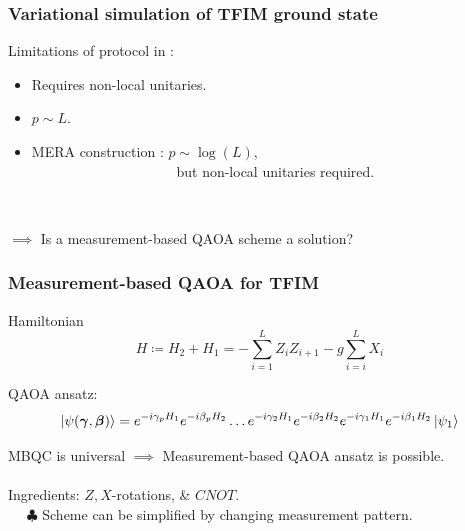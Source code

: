 \documentclass{beamer}
\theoremstyle{definition}
\begin{document}

\begin{frame}
\frametitle{Variational simulation of TFIM ground state}


Limitations of protocol in \cite{VQCS}: 
\begin{itemize}
	
	\item Requires non-local unitaries. 
	
	\item  $p \sim L$.
	
	\item MERA construction \cite{MERA}: $p\sim \log(L)$, \\
	$\quad\quad\quad\quad\quad\quad\qquad\qquad$ but non-local unitaries required.
\end{itemize}

$\,$\\

\pause

$\implies$ Is a measurement-based QAOA scheme a solution?






\end{frame}








\begin{frame}
\frametitle{Measurement-based QAOA for TFIM}

Hamiltonian
\begin{equation*}
H \coloneqq H_2 + H_1 =  - \sum_{i=1}^L Z_i Z_{i+1} - g\sum^L_{i=i}X_i
\end{equation*}


QAOA ansatz:
\begin{equation*}
\left\vert{\psi(\bm{\gamma}, \bm{\beta})}\right\rangle =  \strut {e^{-i\gamma_p H_1}e^{-i\beta_p H_2}} \dots {e^{-i\gamma_2 H_1}e^{-i\beta_2 H_2}} {e^{-i\gamma_1 H_1}e^{-i\beta_1 H_2}} \left\vert{\psi_1}\right\rangle
\end{equation*}

MBQC is universal $\implies$ Measurement-based QAOA ansatz is possible. \\

$\,$\\

Ingredients: $Z,X$-rotations, \& $CNOT$. \\

$\quad$ $\clubsuit$ Scheme can be simplified by changing measurement pattern.  






\end{frame}
\end{document}
